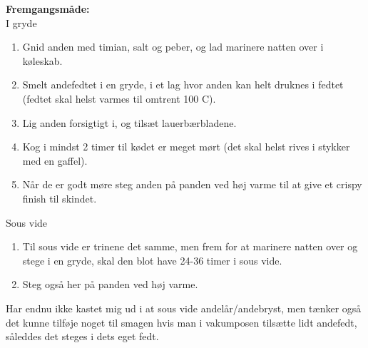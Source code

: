 \documentclass{book}
\begin{document}
\begin{minipage}[t]{0.5\textwidth}
\textbf{Fremgangsmåde:}
\\ I gryde 
\begin{enumerate}
    \item Gnid anden med timian, salt og peber, og lad marinere natten over i køleskab.
    \item Smelt andefedtet i en gryde, i et lag hvor anden kan helt druknes i fedtet (fedtet skal helst varmes til omtrent 100 \degree C).
    \item Lig anden forsigtigt i, og tilsæt lauerbærbladene. 
    \item Kog i mindst 2 timer til kødet er meget mørt (det skal helst rives i stykker med en gaffel).
    \item Når de er godt møre steg anden på panden ved høj varme til at give et crispy finish til skindet.
\end{enumerate}
Sous vide
\begin{enumerate}
    \item Til sous vide er trinene det samme, men frem for at marinere natten over og stege i en gryde, skal den blot have 24-36 timer i sous vide.
    \item Steg også her på panden ved høj varme. 
\end{enumerate}
\end{minipage}
Har endnu ikke kastet mig ud i at sous vide andelår/andebryst, men tænker også det kunne tilføje noget til smagen hvis man i vakumposen tilsætte lidt andefedt, såleddes det steges i dets eget fedt.
\newpage {}
\end{document}

